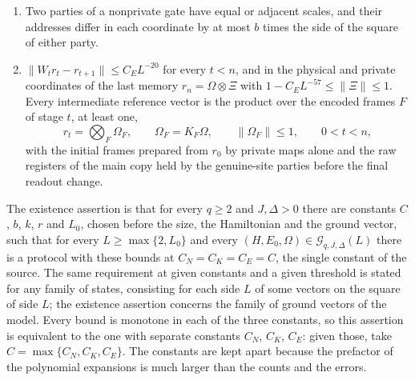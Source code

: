 \begin{definition}
\begin{enumerate}
              absolute coefficient sum at most $C_KL^k$, at most $r$ pair
              effects and at most $r$ pair sources in each monomial. Every
              party participates in at most
              $b$ nonprivate gates over the whole schedule.
        \item Two parties of a nonprivate gate have equal or adjacent scales,
              and their addresses differ in each coordinate by at most $b$
              times the side of the square of either party.
        \item $\lVert W_tr_t-r_{t+1}\rVert\le C_EL^{-20}$ for every $t<n$, and in
              the physical and private coordinates of the last memory
              $r_n=\Omega\otimes\Xi$ with $1-C_EL^{-57}\le\lVert\Xi\rVert\le1$.
              Every intermediate reference vector is the product over the
              encoded frames $F$ of stage $t$, at least one,
              \[
                  r_t=\bigotimes_F\Omega_F,\qquad \Omega_F=K_F\Omega,
                  \qquad \lVert\Omega_F\rVert\le1,\qquad 0<t<n,
              \]
              with the initial frames prepared from $r_0$ by private maps alone and
              the raw registers of the main copy held by the genuine-site parties
              before the final readout change.
    \end{enumerate}
    The existence assertion is that for every $q\ge2$ and $J,\Delta>0$ there are
    constants $C$, $b$, $k$, $r$ and $L_0$, chosen before the size, the
    Hamiltonian and the ground vector, such that for every $L\ge\max\{2,L_0\}$
    and every $(H,E_0,\Omega)\in\mathcal G_{q,J,\Delta}(L)$ there is a protocol
    with these bounds at $C_N=C_K=C_E=C$, the single constant of the source. The
    same requirement at given constants and a given threshold is stated for any
    family of states, consisting for each side $L$ of some vectors on the
    square of side $L$; the existence assertion concerns the family of ground
    vectors of the model. Every
    bound is monotone in each of the three constants, so this assertion is
    equivalent to the one with separate constants $C_N$, $C_K$, $C_E$: given
    those, take $C=\max\{C_N,C_K,C_E\}$. The constants are kept apart because the
    prefactor of the polynomial expansions is much larger than the counts and
    the errors.


\end{definition}
